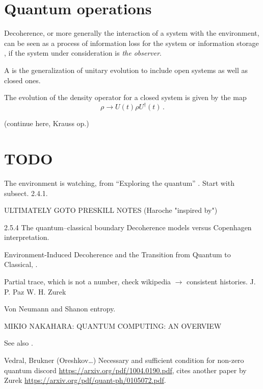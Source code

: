 \section{Quantum operations}

Decoherence,
or more generally the interaction of a system with the environment,
can be seen as a process of information loss for the system
\parencite[Ch. 9]{Nakahara} or information storage
\parencite{Zurek_Einselect}, if the system under consideration
is \emph{the observer}.

A  \parencite[Ch. 9]{Nakahara} is the generalization
of unitary evolution to include open systems as well as closed ones.

The evolution of the density operator for a closed system is given by the map
\[
    \rho \rightarrow U(t) \rho U^{\dagger}(t) \, \text{.}
\] 


(continue here, Krauss op.)

\section{TODO}

The environment is watching, from ``Exploring the quantum''
\parencite[Ch. 4]{Haroche_Exploring}. Start with subsect. 2.4.1.

ULTIMATELY GOTO PRESKILL NOTES (Haroche "inspired by")

2.5.4 The quantum–classical boundary
Decoherence models versus Copenhagen interpretation.

Environment-Induced Decoherence and the Transition from Quantum to Classical,
\cite{Zurek_Fundamentals}.

Partial trace, which is not a number, check wikipedia $\rightarrow$ consistent histories.
J. P. Paz W. H. Zurek

Von Neumann and Shanon entropy.

MIKIO NAKAHARA: QUANTUM COMPUTING: AN OVERVIEW

See also \cite{Schlosshauer_Decoherence}.

Vedral, Brukner (Oreshkov\dots)
Necessary and sufficient condition for non-zero quantum discord
\url{https://arxiv.org/pdf/1004.0190.pdf},
cites another paper by Zurek \url{https://arxiv.org/pdf/quant-ph/0105072.pdf}.
